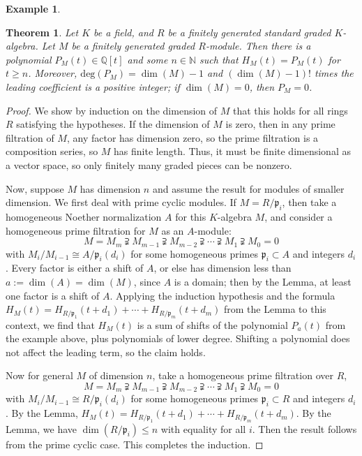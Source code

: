 \documentclass{amsart}[12pt]
\newcommand{\Q}{\mathbb{Q}}
\newcommand{\NN}{\mathbb{N}}
\newcommand{\p}{{\mathfrak p}}
\numberwithin{equation}{section}
\theoremstyle{plain} %
\newtheorem{theorem}[equation]{Theorem}
\theoremstyle{definition}
\newtheorem{ex}[equation]{Example}
\theoremstyle{remark}
\begin{document}
\begin{ex}
\begin{theorem}
	Let $K$ be a field, and $R$ be a finitely generated standard graded $K$-algebra. Let $M$ be a finitely generated graded $R$-module. Then there is a polynomial $P_M(t)\in \Q[t]$ and some $n\in \NN$ such that $H_M(t)=P_M(t)$ for $t\geq n$. Moreover, $\mathrm{deg}(P_M)=\dim(M)-1$ and $(\dim(M)-1)!$ times the leading coefficient is a positive integer; if $\dim(M)=0$, then $P_M=0$.
\end{theorem}
\begin{proof}
	We show by induction on the dimension of $M$ that this holds for all rings $R$ satisfying the hypotheses. If the dimension of $M$ is zero, then in any prime filtration of $M$, any factor has dimension zero, so the prime filtration is a composition series, so $M$ has finite length. Thus, it must be finite dimensional as a vector space, so only finitely many graded pieces can be nonzero.
	
	Now, suppose $M$ has dimension $n$ and assume the result for modules of smaller dimension. We first deal with prime cyclic modules. 	If $M=R/\p_i$, then take a homogeneous Noether normalization $A$ for this $K$-algebra $M$, and consider a homogeneous prime filtration for $M$ as an $A$-module:
	\[M=M_m \supsetneqq M_{m-1} \supsetneqq M_{m-2} \supsetneqq \cdots \supsetneqq  M_1 \supsetneqq M_0 = 0\]
	with $M_i/M_{i-1}\cong A/\p_i(d_i)$ for some homogeneous primes $\p_i\subset A$ and integers $d_i$.
	 Every factor is either a shift of $A$, or else has dimension less than $a:=\dim(A)=\dim(M)$, since $A$ is a domain; then by the Lemma, at least one factor is a shift of $A$. Applying the induction hypothesis and the formula $H_M(t)=H_{R/\p_1}(t+d_1) + \cdots + H_{R/\p_m}(t+d_m)$ from the Lemma to this context, we find that $H_M(t)$ is a sum of shifts of the polynomial $P_a(t)$ from the example above, plus polynomials of lower degree. Shifting a polynomial does not affect the leading term, so the claim holds.
	
	Now for general $M$ of dimension $n$, take a homogeneous prime filtration over $R$,
	\[M=M_m \supsetneqq M_{m-1} \supsetneqq M_{m-2} \supsetneqq \cdots \supsetneqq  M_1 \supsetneqq M_0 = 0\]
	with $M_i/M_{i-1}\cong R/\p_i(d_i)$ for some homogeneous primes $\p_i\subset R$ and integers $d_i$. By the Lemma, $H_M(t)=H_{R/\p_1}(t+d_1) + \cdots + H_{R/\p_m}(t+d_{m})$.
	By the Lemma,  we have $\dim(R/\p_i)\leq n$ with equality for all $i$. Then the result follows from the prime cyclic case. This completes the induction.
\end{proof}



\end{ex}
\end{document}
